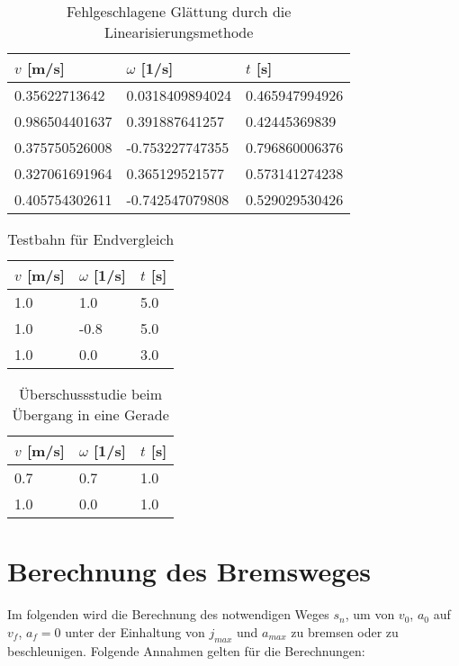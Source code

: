 \begin{table}[htbp]
\caption{Fehlgeschlagene Glättung durch die Linearisierungsmethode}
\centering
\begin{tabular}{@{}lll@{}} \toprule
	$v$ [\si{m/s}] & $\omega$ [\si{1/s}]& $t$ [\si{s}]  \\ \midrule
	0.35622713642 & 0.0318409894024 & 0.465947994926 \\
	0.986504401637 & 0.391887641257 & 0.42445369839 \\
	0.375750526008 & -0.753227747355 & 0.796860006376 \\
	0.327061691964 & 0.365129521577 & 0.573141274238 \\
	0.405754302611 & -0.742547079808 & 0.529029530426 \\ \bottomrule
\end{tabular}
\label{tab:linearization-fail-queue}
\end{table}

\begin{table}[htbp]
\caption{Testbahn für Endvergleich}
\centering
\begin{tabular}{@{}lll@{}} \toprule
	$v$ [\si{m/s}] & $\omega$ [\si{1/s}]& $t$ [\si{s}]  \\ \midrule
	1.0 & 1.0 & 5.0 \\
	1.0 & -0.8 & 5.0 \\
	1.0 & 0.0 & 3.0 \\ \bottomrule
\end{tabular}
\label{tab:final-compare-queue}
\end{table}

\begin{table}[htbp]
\caption{Überschussstudie beim Übergang in eine Gerade}
\centering
\begin{tabular}{@{}lll@{}} \toprule
	$v$ [\si{m/s}] & $\omega$ [\si{1/s}]& $t$ [\si{s}]  \\ \midrule
	0.7 & 0.7 & 1.0 \\
	1.0 & 0.0 & 1.0 \\ \bottomrule
\end{tabular}
\label{tab:sloppiness-study}
\end{table}

\newpage
\section{Berechnung des Bremsweges}
\label{sec:berechnung-des-bremsweges}

Im folgenden wird die Berechnung des notwendigen Weges $s_n$, um von $v_0$,
$a_0$ auf $v_f$, $a_f = 0$ unter der Einhaltung von $j_{max}$
und $a_{max}$ zu bremsen oder zu beschleunigen. Folgende Annahmen
gelten für die Berechnungen:

